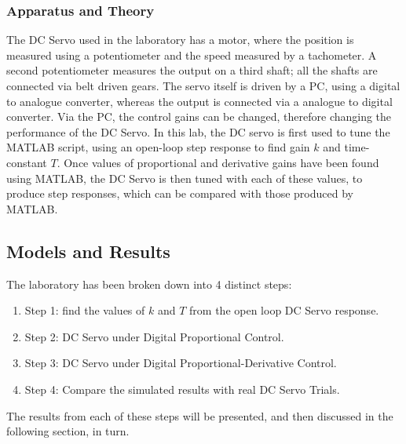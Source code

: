 \documentclass[stu, a4paper, 12pt, floatsintext]{apa7}
\numberwithin{figure}{section}
\numberwithin{table}{section}
\numberwithin{equation}{section}
\begin{document}
\subsubsection{Apparatus and Theory}
The DC Servo used in the laboratory has a motor, where the position is measured using a potentiometer and the speed measured by a tachometer. A second potentiometer measures the output on a third shaft; all the shafts are connected via belt driven gears. The servo itself is driven by a PC, using a digital to analogue converter, whereas the output is connected via a analogue to digital converter. Via the PC, the control gains can be changed, therefore changing the performance of the DC Servo. 
In this lab, the DC servo is first used to tune the MATLAB script, using an open-loop step response to find gain $k$ and time-constant $T$. Once values of proportional and derivative gains have been found using MATLAB, the DC Servo is then tuned with each of these values, to produce step responses, which can be compared with those produced by MATLAB.
\subsection{Models and Results}
The laboratory has been broken down into 4 distinct steps:
\begin{enumerate}
    \item Step 1: find the values of $k$ and $T$ from the open loop DC Servo response. 
    \item Step 2: DC Servo under Digital Proportional Control. 
    \item Step 3: DC Servo under Digital Proportional-Derivative Control.
    \item Step 4: Compare the simulated results with real DC Servo Trials.  
\end{enumerate}
The results from each of these steps will be presented, and then discussed in the following section, in turn. 
\end{document}
